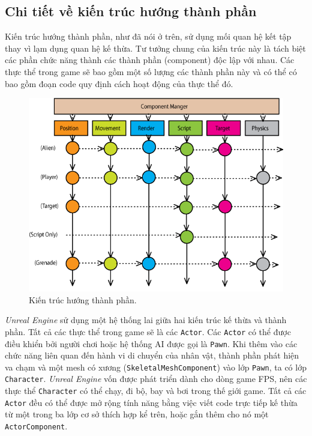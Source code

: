 \documentclass[12pt]{report}
\begin{document}
\subsection{Chi tiết về kiến trúc hướng thành phần}
Kiến trúc hướng thành phần, như đã nói ở trên, sử dụng mối quan hệ kết tập thay vì lạm dụng quan hệ kế thừa. Tư tưởng chung của kiến trúc này là tách biệt các phần chức năng thành các thành phần (component) độc lập với nhau. Các thực thể trong game sẽ bao gồm một số lượng các thành phần này và có thể có bao gồm đoạn code quy định cách hoạt động của thực thể đó.
\begin{figure}[h]
  \centering
    \includegraphics[width=14cm]{Pics/Chap4/components.png}
  \caption{Kiến trúc hướng thành phần.}
\end{figure}

\textit{Unreal Engine} sử dụng một hệ thống lai giữa hai kiến trúc kế thừa và thành phần. Tất cả các thực thể trong game sẽ là các \texttt{Actor}. Các \texttt{Actor} có thể được điều khiển bởi người chơi hoặc hệ thống AI được gọi là \texttt{Pawn}. Khi thêm vào các chức năng liên quan đến hành vi di chuyển của nhân vật, thành phần phát hiện va chạm và một mesh có xương (\texttt{SkeletalMeshComponent}) vào lớp \texttt{Pawn}, ta có lớp \texttt{Character}. \textit{Unreal Engine} vốn được phát triển dành cho dòng game FPS, nên các thực thể \texttt{Character} có thể chạy, đi bộ, bay và bơi trong thế giới game. Tất cả các \texttt{Actor} đều có thể được mở rộng tính năng bằng việc viết code trực tiếp kế thừa từ một trong ba lớp cơ sở thích hợp kể trên, hoặc gắn thêm cho nó một \texttt{ActorComponent}.
\end{document}
